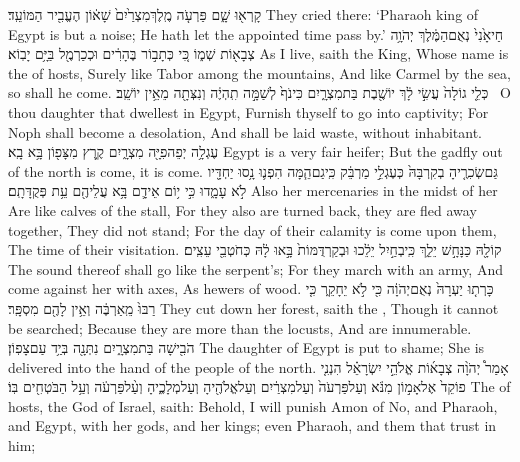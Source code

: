 {קָרְא֖וּ שָׁ֑ם פַּרְעֹ֤ה מֶֽלֶךְ\maqqaf מִצְרַ֙יִם֙ שָׁא֔וֹן הֶעֱבִ֖יר הַמּוֹעֵֽד׃}
{They cried there: ‘Pharaoh king of Egypt is but a noise; He hath let the appointed time pass by.’}
{חַי\maqqaf אָ֙נִי֙ נְאֻם\maqqaf הַמֶּ֔לֶךְ יְהֹוָ֥ה צְבָא֖וֹת שְׁמ֑וֹ כִּ֚י כְּתָב֣וֹר בֶּהָרִ֔ים וּכְכַרְמֶ֖ל בַּיָּ֥ם יָבֽוֹא׃}
{As I live, saith the King, Whose name is the \lord\space of hosts, Surely like Tabor among the mountains, And like Carmel by the sea, so shall he come.}
{כְּלֵ֤י גוֹלָה֙ עֲשִׂ֣י לָ֔ךְ יוֹשֶׁ֖בֶת בַּת\maqqaf מִצְרָ֑יִם כִּי\maqqaf נֹף֙ לְשַׁמָּ֣ה תִֽהְיֶ֔ה וְנִצְּתָ֖ה מֵאֵ֥ין יוֹשֵֽׁב׃ \setuma }
{O thou daughter that dwellest in Egypt, Furnish thyself to go into captivity; For Noph shall become a desolation, And shall be laid waste, without inhabitant.}
{עֶגְלָ֥ה יְפֵה\maqqaf פִיָּ֖ה מִצְרָ֑יִם קֶ֥רֶץ מִצָּפ֖וֹן בָּ֥א בָֽא׃}
{Egypt is a very fair heifer; But the gadfly out of the north is come, it is come.}
{גַּם\maqqaf שְׂכִרֶ֤יהָ בְקִרְבָּהּ֙ כְּעֶגְלֵ֣י מַרְבֵּ֔ק כִּֽי\maqqaf גַם\maqqaf הֵ֧מָּה הִפְנ֛וּ נָ֥סוּ יַחְדָּ֖יו לֹ֣א עָמָ֑דוּ כִּ֣י י֥וֹם אֵידָ֛ם בָּ֥א עֲלֵיהֶ֖ם עֵ֥ת פְּקֻדָּתָֽם׃}
{Also her mercenaries in the midst of her Are like calves of the stall, For they also are turned back, they are fled away together, They did not stand; For the day of their calamity is come upon them, The time of their visitation.}
{קוֹלָ֖הּ כַּנָּחָ֣שׁ יֵלֵ֑ךְ כִּֽי\maqqaf בְחַ֣יִל יֵלֵ֔כוּ וּבְקַרְדֻּמּוֹת֙ בָּ֣אוּ לָ֔הּ כְּחֹטְבֵ֖י עֵצִֽים׃}
{The sound thereof shall go like the serpent’s; For they march with an army, And come against her with axes, As hewers of wood.}
{כָּרְת֤וּ יַעְרָהּ֙ נְאֻם\maqqaf יְהֹוָ֔ה כִּ֖י לֹ֣א יֵחָקֵ֑ר כִּ֤י רַבּוּ֙ מֵֽאַרְבֶּ֔ה וְאֵ֥ין לָהֶ֖ם מִסְפָּֽר׃}
{They cut down her forest, saith the \lord, Though it cannot be searched; Because they are more than the locusts, And are innumerable.}
{הֹבִ֖ישָׁה בַּת\maqqaf מִצְרָ֑יִם נִתְּנָ֖ה בְּיַ֥ד עַם\maqqaf צָפֽוֹן׃}
{The daughter of Egypt is put to shame; She is delivered into the hand of the people of the north.}
{אָמַר֩ יְהֹוָ֨ה צְבָא֜וֹת אֱלֹהֵ֣י יִשְׂרָאֵ֗ל הִנְנִ֤י פוֹקֵד֙ אֶל\maqqaf אָמ֣וֹן מִנֹּ֔א וְעַל\maqqaf פַּרְעֹה֙ וְעַל\maqqaf מִצְרַ֔יִם וְעַל\maqqaf אֱלֹהֶ֖יהָ וְעַל\maqqaf מְלָכֶ֑יהָ וְעַ֨ל\maqqaf פַּרְעֹ֔ה וְעַ֥ל הַבֹּטְחִ֖ים בּֽוֹ׃}
{The \lord\space of hosts, the God of Israel, saith: Behold, I will punish Amon of No, and Pharaoh, and Egypt, with her gods, and her kings; even Pharaoh, and them that trust in him;}
